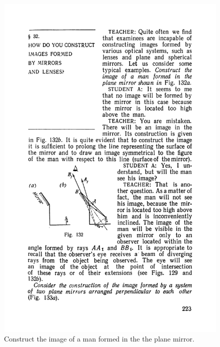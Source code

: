 \documentclass[a4paper,sfsidenotes]{tufte-book}
\begin{document}
\begin{figure}%
\includegraphics[width=.7\linewidth]{fig-132a}
\caption{Construct the image of a man formed in the the plane mirror.}
\label{fig-132}
\end{figure}
\end{document}
